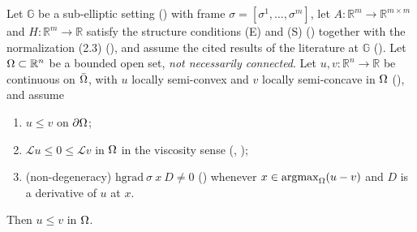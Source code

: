 \begin{theorem}
Let $\mathbb G$ be a sub-elliptic setting () with frame
$\sigma=[\sigma^1,\ldots,\sigma^m]$, let $A:\mathbb R^{m}\to\mathbb R^{m\times m}$ and
$H:\mathbb R^{m}\to\mathbb R$ satisfy the structure conditions (E) and (S)
() together with the normalization (2.3)
(), and assume the cited results of the literature at $\mathbb G$
(). Let $\Omega\subset\mathbb R^{n}$ be a bounded open set, \emph{not
necessarily connected}. Let $u,v:\mathbb R^{n}\to\mathbb R$ be continuous on $\bar{\Omega}$,
with $u$ locally semi-convex and $v$ locally semi-concave in $\Omega$
(), and assume
\begin{enumerate}
\item $u\le v$ on $\partial\Omega$;
\item $\mathcal Lu\le0\le\mathcal Lv$ in $\Omega$ in the viscosity sense
  (, );
\item (non-degeneracy) $\mathrm{hgrad}\ \sigma\ x\ D\ne0$ () whenever
  $x\in\operatorname*{argmax}_\Omega(u-v)$ and $D$ is a derivative of $u$ at $x$.
\end{enumerate}
Then $u\le v$ in $\Omega$.
\end{theorem}
